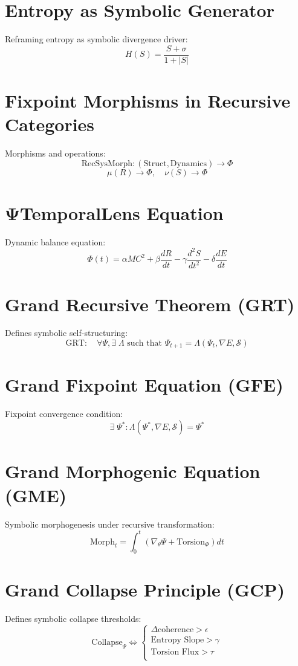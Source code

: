 \documentclass[12pt]{article}
\begin{document}
\section{Entropy as Symbolic Generator}
Reframing entropy as symbolic divergence driver:
\[
H(S) = \frac{S + \sigma}{1 + |S|}
\]

\section{Fixpoint Morphisms in Recursive Categories}
Morphisms and operations:
\[
\text{RecSysMorph} : (\text{Struct}, \text{Dynamics}) \to \Phi
\]
\[
\mu(R) \to \Phi, \quad \nu(S) \to \Phi
\]

\section{ΨTemporalLens Equation}
Dynamic balance equation:
\[
\Phi(t) = \alpha M C^2 + \beta \frac{dR}{dt} - \gamma \frac{d^2 S}{dt^2} - \delta \frac{dE}{dt}
\]

\section{Grand Recursive Theorem (GRT)}
Defines symbolic self-structuring:
\[
\text{GRT}: \quad \forall \Psi, \exists \; \Lambda \text{ such that } \Psi_{t+1} = \Lambda(\Psi_t, \nabla E, \mathcal{S})
\]

\section{Grand Fixpoint Equation (GFE)}
Fixpoint convergence condition:
\[
\exists \; \Psi^* : \Lambda(\Psi^*, \nabla E, \mathcal{S}) = \Psi^*
\]

\section{Grand Morphogenic Equation (GME)}
Symbolic morphogenesis under recursive transformation:
\[
\text{Morph}_t = \int_0^t \left( \nabla_\theta \Psi + \text{Torsion}_\Phi \right) dt
\]

\section{Grand Collapse Principle (GCP)}
Defines symbolic collapse thresholds:
\[
\text{Collapse}_\Psi \iff \left\{ 
\begin{array}{l}
\Delta \text{coherence} > \epsilon \\
\text{Entropy Slope} > \gamma \\
\text{Torsion Flux} > \tau \\
\end{array}
\right.
\]
\end{document}
